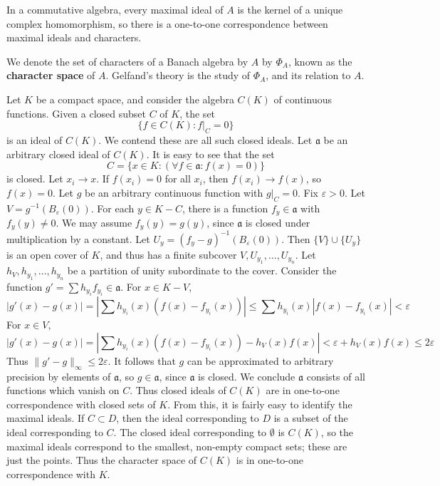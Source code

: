 \begin{corollary}
    In a commutative algebra, every maximal ideal of $A$ is the kernel of a unique complex homomorphism, so there is a one-to-one correspondence between maximal ideals and characters.
\end{corollary}

We denote the set of characters of a Banach algebra by $A$ by $\Phi_A$, known as the {\bf character space} of $A$. Gelfand's theory is the study of $\Phi_A$, and its relation to $A$.

\begin{example}
    Let $K$ be a compact space, and consider the algebra $C(K)$ of continuous functions. Given a closed subset $C$ of $K$, the set
    \[ \{ f \in C(K) : f|_C = 0 \} \]
    is an ideal of $C(K)$. We contend these are all such closed ideals. Let $\mathfrak{a}$ be an arbitrary closed ideal of $C(K)$. It is easy to see that the set
    \[ C = \{ x \in K : (\forall f \in \mathfrak{a}: f(x) = 0) \} \]
    is closed. Let $x_i \to x$. If $f(x_i) = 0$ for all $x_i$, then $f(x_i) \to f(x)$, so $f(x) = 0$. Let $g$ be an arbitrary continuous function with $g|_C = 0$. Fix $\varepsilon > 0$. Let $V = g^{-1}(B_\varepsilon(0))$. For each $y \in K - C$, there is a function $f_y \in \mathfrak{a}$ with $f_y(y) \neq 0$. We may assume $f_y(y) = g(y)$, since $\mathfrak{a}$ is closed under multiplication by a constant. Let $U_y = (f_y - g)^{-1}(B_\varepsilon(0))$. Then $\{ V \} \cup \{ U_y \}$ is an open cover of $K$, and thus has a finite subcover $V, U_{y_1}, \dots, U_{y_n}$. Let $h_V, h_{y_1}, \dots, h_{y_n}$ be a partition of unity subordinate to the cover. Consider the function $g' = \sum h_{y_i} f_{y_i} \in \mathfrak{a}$. For $x \in K - V$,
    \[ |g'(x) - g(x)| = | \sum h_{y_i}(x) (f(x) - f_{y_i}(x)) | \leq \sum h_{y_i}(x) |f(x) - f_{y_i}(x)| < \varepsilon \]
    For $x \in V$,
    \[ |g'(x) - g(x)| = | \sum h_{y_i}(x) (f(x) - f_{y_i}(x)) - h_V(x) f(x) | < \varepsilon + h_V(x) f(x) \leq 2 \varepsilon \]
    Thus $\| g' - g \|_\infty \leq 2 \varepsilon$. It follows that $g$ can be approximated to arbitrary precision by elements of $\mathfrak{a}$, so $g \in \mathfrak{a}$, since $\mathfrak{a}$ is closed. We conclude $\mathfrak{a}$ consists of all functions which vanish on $C$. Thus closed ideals of $C(K)$ are in one-to-one correspondence with closed sets of $K$. From this, it is fairly easy to identify the maximal ideals. If $C \subset D$, then the ideal corresponding to $D$ is a subset of the ideal corresponding to $C$. The closed ideal corresponding to $\emptyset$ is $C(K)$, so the maximal ideals correspond to the smallest, non-empty compact sets; these are just the points. Thus the character space of $C(K)$ is in one-to-one correspondence with $K$.
\end{example}

